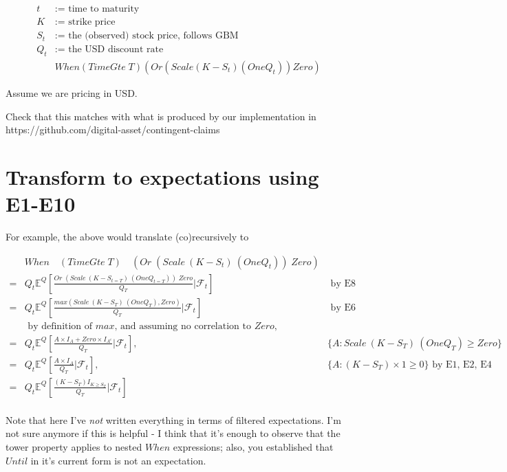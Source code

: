 \documentclass[a4paper]{article}
\begin{document}
\begin{align*}
  t &:= \text{ time to maturity} \\
  K &:= \text{ strike price} \\
  S_t &:= \text{ the (observed) stock price, follows GBM} \\
  Q_t & := \text{ the USD discount rate } \\
  & When (TimeGte \; T) (Or (Scale (K - S_t) (One Q_t)) Zero)
\end{align*}


Assume we are pricing in USD.

Check that this matches with what is produced by our implementation in https://github.com/digital-asset/contingent-claims

\section{Transform to expectations using E1-E10}

For example, the above would translate (co)recursively to

\begin{align*}
& When \quad (TimeGte \; T) \quad (Or \; (Scale \: (K - S_t) \: (One Q_t)) \; Zero) \\
= & Q_t \mathbb{E}^Q[ \frac{ Or \; (Scale \: (K - S_{t = T}) \: (One Q_{t = T})) \; Zero } { Q_T } | \mathcal{F}_t ] & \text{ by E8} \\
= & Q_t \mathbb{E}^Q[ \frac{ max ( Scale \: (K - S_T) \: (One Q_T) , Zero ) } { Q_T } | \mathcal{F}_t ] & \text{ by E6} \\
& \text{ by definition of $max$, and assuming no correlation to $Zero$, } \\
= & Q_t \mathbb{E}^Q[ \frac{  A \times I_A  + Zero \times I_{A^c}} { Q_T } | \mathcal{F}_t ] , & \{ A : Scale \: (K - S_T) \: (One Q_T) \geq Zero \} \\
= & Q_t \mathbb{E}^Q[ \frac{  A \times I_A } { Q_T } | \mathcal{F}_t ] , & \{ A : (K - S_T) \times 1 \geq 0 \} \text{ by E1, E2, E4} \\
= & Q_t \mathbb{E}^Q[ \frac{  (K - S_T) I_{K \geq S_T} } { Q_T } | \mathcal{F}_t ] \\
\end{align*}

Note that here I've \emph{not} written everything in terms of filtered expectations. I'm not sure anymore if this is helpful - I think that it's enough to observe that the tower property applies to nested $When$ expressions; also, you established that $Until$ in it's current form is not an expectation. 
\end{document}
